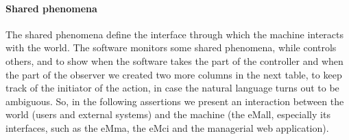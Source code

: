 \paragraph{Shared phenomena} The shared phenomena define the interface through which the machine interacts with the world. The software monitors some shared phenomena, while controls others, and to show when the software takes the part of the controller and when the part of the observer we created two more columns in the next table, to keep track of the initiator of the action, in case the natural language turns out to be ambiguous. So, in the following assertions we present an interaction between the world (users and external systems) and the machine (the eMall, especially its interfaces, such as the eMma, the eMci and the managerial web application).

\setcounter{sp}{1}
\newcommand{\spcount}{\thesp\stepcounter{sp}}
